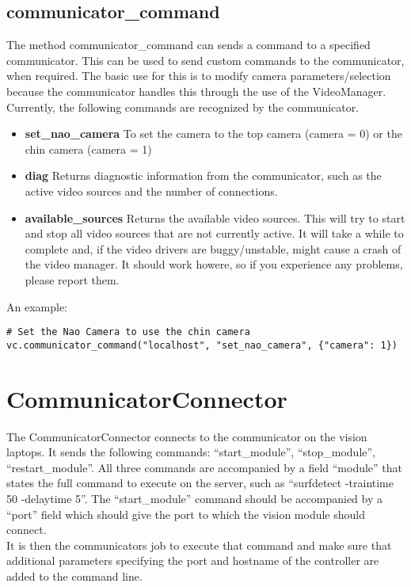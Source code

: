 \documentclass[a4paper, 10pt, oneside]{article}
\begin{document}
\subsection{communicator\_command}
The method communicator\_command can sends a command to a specified
communicator. This can be used to send custom commands to the communicator, when
required. The basic use for this is to modify camera parameters/selection
because the communicator handles this through the use of the VideoManager.
Currently, the following commands are recognized by the communicator.

\begin{itemize}
    \item \textbf{set\_nao\_camera} To set the camera to the top camera 
        (camera = 0) or the chin camera (camera = 1)
    \item \textbf{diag} Returns diagnostic information from the communicator,
        such as the active video sources and the number of connections.
    \item \textbf{available\_sources} Returns the available video sources. This
        will try to start and stop all video sources that are not currently
        active. It will take a while to complete and, if the video drivers
        are buggy/unstable, might cause a crash of the video manager. It should
        work howere, so if you experience any problems, please report them.
\end{itemize}

An example:
\begin{lstlisting}
# Set the Nao Camera to use the chin camera
vc.communicator_command("localhost", "set_nao_camera", {"camera": 1})
\end{lstlisting}

\section{CommunicatorConnector}
The CommunicatorConnector connects to the communicator on the vision laptops. It
sends the following commands: ``start\_module'', ``stop\_module'',
``restart\_module''. All three commands are accompanied by a field ``module''
that states the full command to execute on the server, such as ``surfdetect
-traintime 50 -delaytime 5''. The ``start\_module'' command should be
accompanied by a ``port'' field which should give the port to which the vision
module should connect. \\

It is then the communicators job to execute that command and make sure that
additional parameters specifying the port and hostname of the controller are
added to the command line.
\end{document}
